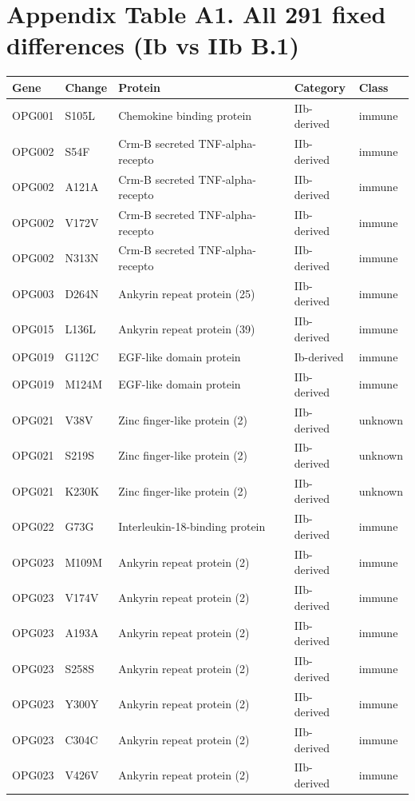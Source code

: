 \documentclass[11pt]{article}
\begin{document}
\section*{Appendix Table A1. All 291 fixed differences (Ib vs IIb B.1)}
\begin{longtable}{lllll}
\hline Gene & Change & Protein & Category & Class \\ \hline \endhead
OPG001 & S105L & Chemokine binding protein & IIb-derived & immune \\
OPG002 & S54F & Crm-B secreted TNF-alpha-recepto & IIb-derived & immune \\
OPG002 & A121A & Crm-B secreted TNF-alpha-recepto & IIb-derived & immune \\
OPG002 & V172V & Crm-B secreted TNF-alpha-recepto & IIb-derived & immune \\
OPG002 & N313N & Crm-B secreted TNF-alpha-recepto & IIb-derived & immune \\
OPG003 & D264N & Ankyrin repeat protein (25) & IIb-derived & immune \\
OPG015 & L136L & Ankyrin repeat protein (39) & IIb-derived & immune \\
OPG019 & G112C & EGF-like domain protein & Ib-derived & immune \\
OPG019 & M124M & EGF-like domain protein & IIb-derived & immune \\
OPG021 & V38V & Zinc finger-like protein (2) & IIb-derived & unknown \\
OPG021 & S219S & Zinc finger-like protein (2) & IIb-derived & unknown \\
OPG021 & K230K & Zinc finger-like protein (2) & IIb-derived & unknown \\
OPG022 & G73G & Interleukin-18-binding protein & IIb-derived & immune \\
OPG023 & M109M & Ankyrin repeat protein (2) & IIb-derived & immune \\
OPG023 & V174V & Ankyrin repeat protein (2) & IIb-derived & immune \\
OPG023 & A193A & Ankyrin repeat protein (2) & IIb-derived & immune \\
OPG023 & S258S & Ankyrin repeat protein (2) & IIb-derived & immune \\
OPG023 & Y300Y & Ankyrin repeat protein (2) & IIb-derived & immune \\
OPG023 & C304C & Ankyrin repeat protein (2) & IIb-derived & immune \\
OPG023 & V426V & Ankyrin repeat protein (2) & IIb-derived & immune \\

\end{longtable}
\end{document}
